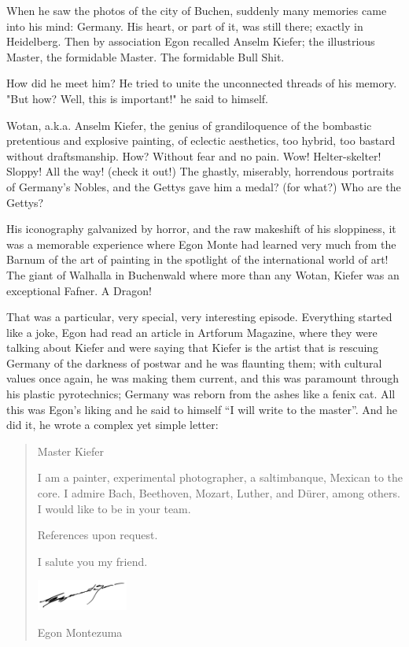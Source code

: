 \documentclass[smalldemyvopaper,11pt,twoside,onecolumn,openright,extrafontsizes]{memoir}
\begin{document}
\lettrine[lines=3,lraise=0.05, nindent=0.2, findent=0.2]{W}{}hen he saw the photos of the city of Buchen, suddenly many memories came into his mind: Germany. His heart, or part of it, was still there; exactly in Heidelberg. Then by association Egon recalled Anselm Kiefer; the illustrious Master, the formidable Master. The formidable Bull Shit.

How did he meet him? He tried to unite the unconnected threads of his memory. "But how? Well, this is important!" he said to himself.

Wotan, a.k.a. Anselm Kiefer, the genius of grandiloquence of the bombastic pretentious and explosive painting, of eclectic aesthetics, too hybrid, too bastard without draftsmanship. How? Without fear and no pain. Wow! Helter-skelter! Sloppy! All the way! (check it out!) The ghastly, miserably, horrendous portraits of Germany’s Nobles, and the Gettys gave him a medal? (for what?) Who are the Gettys?

His iconography galvanized by horror, and the raw makeshift of his sloppiness, it was a memorable experience where Egon Monte had learned very much from the Barnum of the art of painting in the spotlight of the international world of art! The giant of Walhalla in Buchenwald where more than any Wotan, Kiefer was an exceptional Fafner. A Dragon!

That was a particular, very special, very interesting episode. Everything started like a joke, Egon had read an article in Artforum Magazine, where they were talking about Kiefer and were saying that Kiefer is the artist that is rescuing Germany of the darkness of postwar and he was flaunting them; with cultural values once again, he was making them current, and this was paramount through his plastic pyrotechnics; Germany was reborn from the ashes like a fenix cat. All this was Egon’s liking and he said to himself “I will write to the master”. And he did it, he wrote a complex yet simple letter:

\begin{quote}
    Master Kiefer

    I am a painter, experimental photographer, a saltimbanque, Mexican to the core. I admire Bach, Beethoven, Mozart, Luther, and Dürer, among others. I would like to be in your team. 
    
    References upon request. 

    I salute you my friend.

\includegraphics[width=3cm]{./images/Egon}

    Egon Montezuma    
\end{quote}
\end{document}
